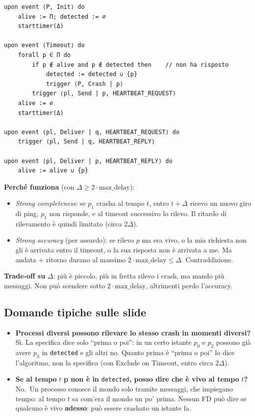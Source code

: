 \begin{verbatim}
upon event ⟨P, Init⟩ do
    alive := Π; detected := ∅
    starttimer(Δ)

upon event ⟨Timeout⟩ do
    forall p ∈ Π do
        if p ∉ alive and p ∉ detected then    // non ha risposto
            detected := detected ∪ {p}
            trigger ⟨P, Crash | p⟩
        trigger ⟨pl, Send | p, HEARTBEAT_REQUEST⟩
    alive := ∅
    starttimer(Δ)

upon event ⟨pl, Deliver | q, HEARTBEAT_REQUEST⟩ do
    trigger ⟨pl, Send | q, HEARTBEAT_REPLY⟩

upon event ⟨pl, Deliver | p, HEARTBEAT_REPLY⟩ do
    alive := alive ∪ {p}
\end{verbatim}

\textbf{Perché funziona} (con \(\Delta \ge 2 \cdot \text{max\_delay}\)):

\begin{itemize}
\tightlist
\item
  \emph{Strong completeness}: se \(p_1\) crasha al tempo \(t\), entro \(t + \Delta\) ricevo un nuovo giro di ping, \(p_1\) non risponde, e al timeout successivo lo rilevo. Il ritardo di rilevamento è quindi limitato (circa \(2\Delta\)).
\item
  \emph{Strong accuracy} (per assurdo): se rilevo \(p\) ma era vivo, o la mia richiesta non gli è arrivata entro il timeout, o la sua risposta non è arrivata a me. Ma andata + ritorno durano al massimo \(2 \cdot \text{max\_delay} \le \Delta\). Contraddizione.
\end{itemize}

\textbf{Trade-off su} \(\Delta\): più è piccolo, più in fretta rilevo i crash, ma mando più messaggi. Non può scendere sotto \(2 \cdot \text{max\_delay}\), altrimenti perdo l'accuracy.

\subsection{Domande tipiche sulle slide}

\begin{itemize}
\tightlist
\item
  \textbf{Processi diversi possono rilevare lo stesso crash in momenti diversi?} Sì. La specifica dice solo ``prima o poi'': in un certo istante \(p_0\) e \(p_2\) possono già avere \(p_3\) in \texttt{detected} e gli altri no. Quanto prima è ``prima o poi'' lo dice l'algoritmo, non la specifica (con Exclude on Timeout, entro circa \(2\Delta\)).
\item
  \textbf{Se al tempo} \(t\) \textbf{p non è in} \texttt{detected}\textbf{, posso dire che è vivo al tempo} \(t\)\textbf{?} No.~Un processo conosce il mondo solo tramite messaggi, che impiegano tempo: al tempo \(t\) sa com'era il mondo un po' prima. Nessun FD può dire se qualcuno è vivo \textbf{adesso}: può essere crashato un istante fa.
\end{itemize}

